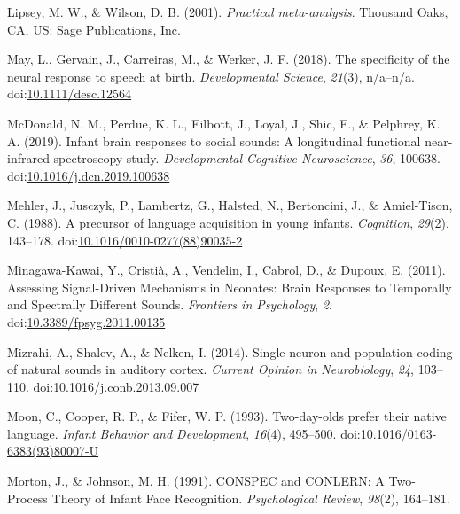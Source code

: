 \documentclass[man]{apa6}
\begin{document}
\hypertarget{ref-lipsey_practical_2001}{}
Lipsey, M. W., \& Wilson, D. B. (2001). \emph{Practical meta-analysis}.
Thousand Oaks, CA, US: Sage Publications, Inc.

\hypertarget{ref-may_specificity_2018}{}
May, L., Gervain, J., Carreiras, M., \& Werker, J. F. (2018). The
specificity of the neural response to speech at birth.
\emph{Developmental Science}, \emph{21}(3), n/a--n/a.
doi:\href{https://doi.org/10.1111/desc.12564}{10.1111/desc.12564}

\hypertarget{ref-mcdonald_infant_2019}{}
McDonald, N. M., Perdue, K. L., Eilbott, J., Loyal, J., Shic, F., \&
Pelphrey, K. A. (2019). Infant brain responses to social sounds: A
longitudinal functional near-infrared spectroscopy study.
\emph{Developmental Cognitive Neuroscience}, \emph{36}, 100638.
doi:\href{https://doi.org/10.1016/j.dcn.2019.100638}{10.1016/j.dcn.2019.100638}

\hypertarget{ref-mehler_precursor_1988}{}
Mehler, J., Jusczyk, P., Lambertz, G., Halsted, N., Bertoncini, J., \&
Amiel-Tison, C. (1988). A precursor of language acquisition in young
infants. \emph{Cognition}, \emph{29}(2), 143--178.
doi:\href{https://doi.org/10.1016/0010-0277(88)90035-2}{10.1016/0010-0277(88)90035-2}

\hypertarget{ref-minagawa-kawai_assessing_2011}{}
Minagawa-Kawai, Y., Cristià, A., Vendelin, I., Cabrol, D., \& Dupoux, E.
(2011). Assessing Signal-Driven Mechanisms in Neonates: Brain Responses
to Temporally and Spectrally Different Sounds. \emph{Frontiers in
Psychology}, \emph{2}.
doi:\href{https://doi.org/10.3389/fpsyg.2011.00135}{10.3389/fpsyg.2011.00135}

\hypertarget{ref-mizrahi_single_2014}{}
Mizrahi, A., Shalev, A., \& Nelken, I. (2014). Single neuron and
population coding of natural sounds in auditory cortex. \emph{Current
Opinion in Neurobiology}, \emph{24}, 103--110.
doi:\href{https://doi.org/10.1016/j.conb.2013.09.007}{10.1016/j.conb.2013.09.007}

\hypertarget{ref-moon_two-day-olds_1993}{}
Moon, C., Cooper, R. P., \& Fifer, W. P. (1993). Two-day-olds prefer
their native language. \emph{Infant Behavior and Development},
\emph{16}(4), 495--500.
doi:\href{https://doi.org/10.1016/0163-6383(93)80007-U}{10.1016/0163-6383(93)80007-U}

\hypertarget{ref-morton_conspec_1991}{}
Morton, J., \& Johnson, M. H. (1991). CONSPEC and CONLERN: A Two-Process
Theory of Infant Face Recognition. \emph{Psychological Review},
\emph{98}(2), 164--181.
\end{document}
